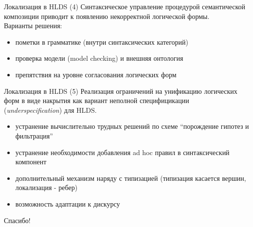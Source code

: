 \documentclass{beamer}
\begin{document}
\begin{frame}{Локализация в HLDS (4)}
Синтаксическое управление процедурой семантической композиции приводит к появлению некорректной логической формы.\\
\bigskip
Варианты решения:\\
\bigskip
\begin{itemize}
	\item пометки в грамматике (внутри синтаксических категорий)
	\item проверка модели (model checking) и внешняя онтология
	\item препятствия на уровне согласования логических форм
\end{itemize}
\end{frame}

\begin{frame}{Локализация в HLDS (5)}
Реализация ограничений на унификацию логических форм в виде накрытия как вариант неполной специфицикации (\textit{underspecification}) для HLDS.\\
\bigskip
\begin{itemize}
	\item устранение вычислительно трудных решений по схеме ``порождение гипотез и фильтрация''
	\item устранение необходимости добавления ad hoc правил в синтаксический компонент
	\item дополнительный механизм наряду с типизацией (типизация касается вершин, локализация - ребер)
	\item возможность адаптации к дискурсу
\end{itemize}
\end{frame}


\begin{frame}{}
    \thispagestyle{empty}
    \begin{center}
        {\large Спасибо!}
    \end{center}
\end{frame}


\end{document}
